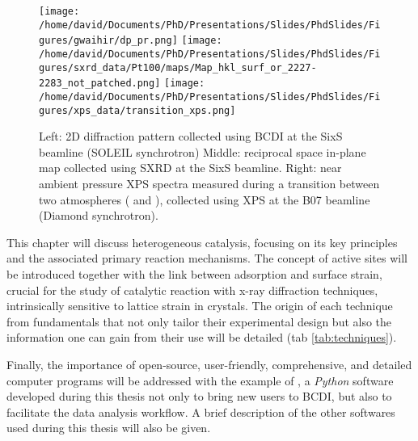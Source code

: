 \begin{figure}[!htb]
    \centering
    \texttt{[image: /home/david/Documents/PhD/Presentations/Slides/PhdSlides/Figures/gwaihir/dp\_pr.png]}
    \texttt{[image: /home/david/Documents/PhD/Presentations/Slides/PhdSlides/Figures/sxrd\_data/Pt100/maps/Map\_hkl\_surf\_or\_2227-2283\_not\_patched.png]}
    \texttt{[image: /home/david/Documents/PhD/Presentations/Slides/PhdSlides/Figures/xps\_data/transition\_xps.png]}
    \caption{
    Left: 2D diffraction pattern collected using BCDI at the SixS beamline (SOLEIL synchrotron)
    Middle: reciprocal space in-plane map collected using SXRD at the SixS beamline.
    Right: near ambient pressure XPS spectra measured during a transition between two atmospheres (  and ), collected using XPS at the B07 beamline (Diamond synchrotron).
    }
    \label{fig:TechniquesDataExamples}
\end{figure}

This chapter will discuss heterogeneous catalysis, focusing on its key principles and the associated primary reaction mechanisms.
The concept of active sites will be introduced together with the link between adsorption and surface strain, crucial for the study of catalytic reaction with x-ray diffraction techniques, intrinsically sensitive to lattice strain in crystals.
The origin of each technique from fundamentals that not only tailor their experimental design but also the information one can gain from their use will be detailed (tab \ref{tab:techniques}).

Finally, the importance of open-source, user-friendly, comprehensive, and detailed computer programs will be addressed with the example of , a \textit{Python} software developed during this thesis not only to bring new users to BCDI, but also to facilitate the data analysis workflow.
A brief description of the other softwares used during this thesis will also be given.